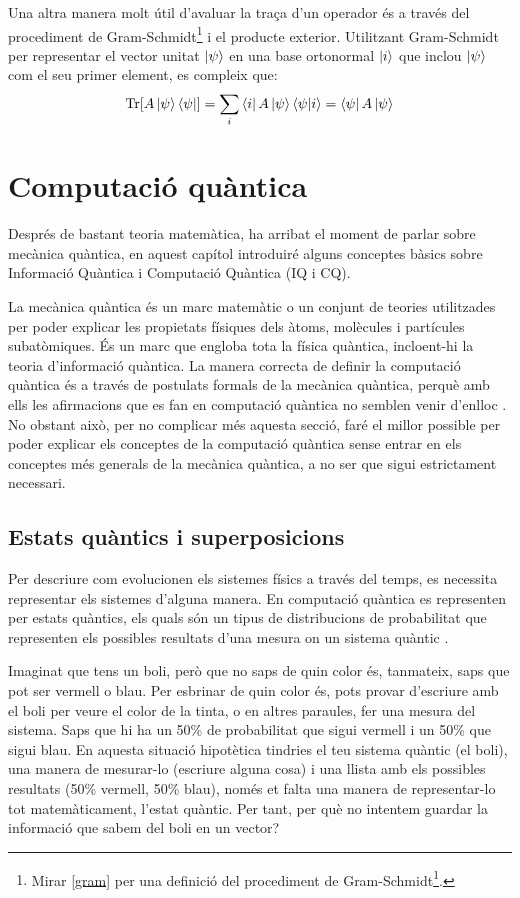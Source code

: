 Una altra manera molt útil d'avaluar la traça d'un operador és a través del procediment de Gram-Schmidt\footnote{Mirar \ref{gram} per una definició del procediment de Gram-Schmidt\footnote{S'utilitza per poder generar bases ortonormals a partir d'un conjunt de vectors.}.} i el producte exterior.
Utilitzant Gram-Schmidt per representar el vector unitat $\ket{\psi}$ en una base ortonormal $\ket{i}$ que inclou $\ket{\psi}$ com el seu primer element, es compleix que:
$$
\Tr[A\ket{\psi}\bra{\psi}] = \sum_i \bra{i}A\ket{\psi}\bra{\psi}\ket{i} = \bra{\psi}A\ket{\psi}
$$

\chapter{Computació quàntica}
Després de bastant teoria matemàtica, ha arribat el moment de parlar sobre mecànica quàntica, en aquest capítol introduiré  alguns conceptes bàsics sobre Informació Quàntica i Computació Quàntica (IQ i CQ).

La mecànica quàntica és un marc matemàtic o un conjunt de teories utilitzades per poder explicar les propietats físiques dels àtoms, molècules i partícules subatòmiques. És un marc que engloba tota la física quàntica, incloent-hi la teoria d'informació quàntica. La manera correcta de definir la computació quàntica és a través de postulats formals de la mecànica quàntica, perquè amb ells les afirmacions que es fan en computació quàntica no semblen venir d'enlloc \cite{QCandQI:QM_postulates}. No obstant això, per no complicar més aquesta secció, faré el millor possible per poder explicar els conceptes de la computació quàntica sense entrar en els conceptes més generals de la mecànica quàntica, a no ser que sigui estrictament necessari.

\section{Estats quàntics i superposicions}
Per descriure com evolucionen els sistemes físics a través del temps, es necessita representar els sistemes d'alguna manera. En computació quàntica es representen per estats quàntics, els quals són un tipus de distribucions de probabilitat que representen els possibles resultats d'una mesura on un sistema quàntic \cite{QT_concepts:q_systems}.

Imaginat que tens un boli, però que no saps de quin color és, tanmateix, saps que pot ser vermell o blau. Per esbrinar de quin color és, pots provar d'escriure amb el boli per veure el color de la tinta, o en altres paraules, fer una mesura del sistema. Saps que hi ha un 50\% de probabilitat que sigui vermell i un 50\% que sigui blau. En aquesta situació hipotètica tindries el teu sistema quàntic (el boli), una manera de mesurar-lo (escriure alguna cosa) i una llista amb els possibles resultats (50\% vermell, 50\% blau), només et falta una manera de representar-lo tot matemàticament, l'estat quàntic. Per tant, per què no intentem guardar la informació que sabem del boli en un vector?

